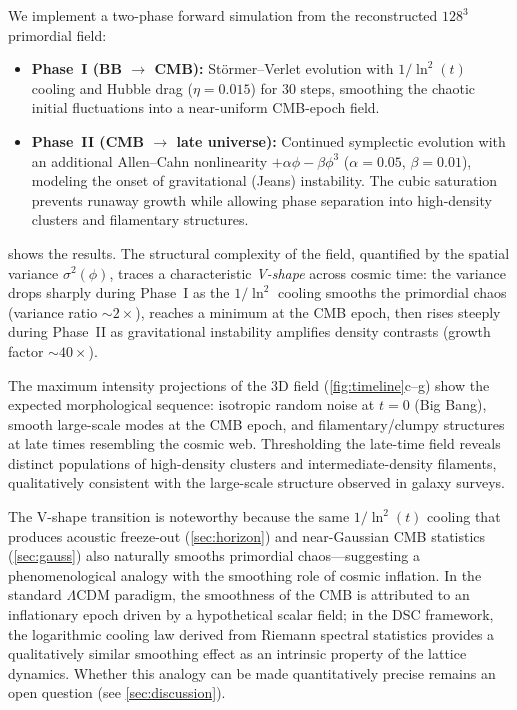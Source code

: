 We implement a two-phase forward simulation from the reconstructed $128^3$ primordial field:
\begin{itemize}
  \item \textbf{Phase~I (BB $\to$ CMB):} St\"ormer--Verlet evolution with $1/\ln^2(t)$ cooling and Hubble drag ($\eta = 0.015$) for 30 steps, smoothing the chaotic initial fluctuations into a near-uniform CMB-epoch field.
  \item \textbf{Phase~II (CMB $\to$ late universe):} Continued symplectic evolution with an additional Allen--Cahn nonlinearity $+\alpha\phi - \beta\phi^3$ ($\alpha = 0.05$, $\beta = 0.01$), modeling the onset of gravitational (Jeans) instability.
  The cubic saturation prevents runaway growth while allowing phase separation into high-density clusters and filamentary structures.
\end{itemize}

 shows the results.
The structural complexity of the field, quantified by the spatial variance $\sigma^2(\phi)$, traces a characteristic \emph{V-shape} across cosmic time:
the variance drops sharply during Phase~I as the $1/\ln^2$ cooling smooths the primordial chaos (variance ratio $\sim 2\times$), reaches a minimum at the CMB epoch, then rises steeply during Phase~II as gravitational instability amplifies density contrasts (growth factor $\sim 40\times$).

The maximum intensity projections of the 3D field (\cref{fig:timeline}c--g) show the expected morphological sequence: isotropic random noise at $t = 0$ (Big Bang), smooth large-scale modes at the CMB epoch, and filamentary/clumpy structures at late times resembling the cosmic web.
Thresholding the late-time field reveals distinct populations of high-density clusters and intermediate-density filaments, qualitatively consistent with the large-scale structure observed in galaxy surveys.

The V-shape transition is noteworthy because the same $1/\ln^2(t)$ cooling that produces acoustic freeze-out (\cref{sec:horizon}) and near-Gaussian CMB statistics (\cref{sec:gauss}) also naturally smooths primordial chaos---suggesting a phenomenological analogy with the smoothing role of cosmic inflation.
In the standard $\Lambda$CDM paradigm, the smoothness of the CMB is attributed to an inflationary epoch driven by a hypothetical scalar field; in the DSC framework, the logarithmic cooling law derived from Riemann spectral statistics provides a qualitatively similar smoothing effect as an intrinsic property of the lattice dynamics.
Whether this analogy can be made quantitatively precise remains an open question (see \cref{sec:discussion}).

